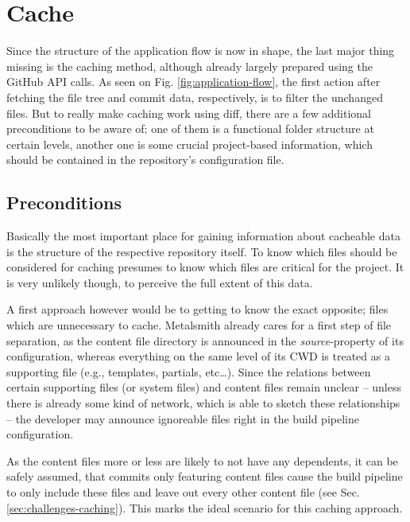 \section{Cache}
\label{sec:implementation-cache}

Since the structure of the application flow is now in shape, the last major thing missing is the caching method, although already largely prepared using the GitHub API calls. As seen on Fig. \ref{fig:application-flow}, the first action after fetching the file tree and commit data, respectively, is to filter the unchanged files.
But to really make caching work using diff, there are a few additional preconditions to be aware of; one of them is a functional folder structure at certain levels, another one is some crucial project-based information, which should be contained in the repository's configuration file.

\subsection{Preconditions}
Basically the most important place for gaining information about cacheable data is the structure of the respective repository itself. To know which files should be considered for caching presumes to know which files are critical for the project. It is very unlikely though, to perceive the full extent of this data.

A first approach however would be to getting to know the exact opposite; files which are unnecessary to cache. Metalsmith already cares for a first step of file separation, as the content file directory is announced in the \emph{source}-property of its configuration, whereas everything on the same level of its CWD is treated as a supporting file (e.g., templates, partials, etc\ldots). Since the relations between certain supporting files (or system files) and content files remain unclear -- unless there is already some kind of network, which is able to sketch these relationships -- the developer may announce ignoreable files right in the build pipeline configuration.

As the content files more or less are likely to not have any dependents, it can be safely assumed, that commits only featuring content files cause the build pipeline to only include these files and leave out every other content file (see Sec. \ref{sec:challenges-caching}). This marks the ideal scenario for this caching approach.

